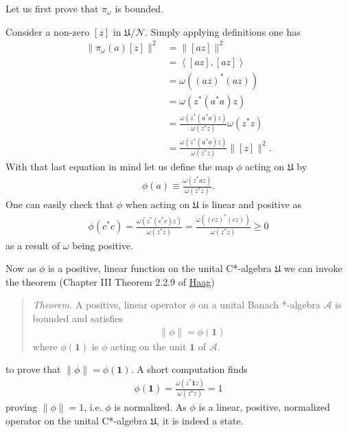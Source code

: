 Let us first prove that $\pi_\omega$ is bounded.

Consider a non-zero $[z]$ in $\mathfrak{U} / \mathcal{N}$. Simply applying definitions one has
\begin{align}
    \|\pi_\omega(a)[z]\|^2 &= \|[az]\|^2 \\
                           &= \left<[az], [az]\right> \\
                           &= \omega((az)^*(az)) \\
                           &= \omega(z^*(a^*a)z) \\
                           &= \frac{\omega(z^*(a^*a)z)}{\omega(z^*z)} \omega(z^*z) \\
                           &= \frac{\omega(z^*(a^*a)z)}{\omega(z^*z)} \|[z]\|^2.
\end{align}
With that last equation in mind let us define the map $\phi$ acting on $\mathfrak{U}$ by
\begin{align}
    \phi(a) \equiv \frac{\omega(z^*az)}{\omega(z^*z)}.
\end{align}
One can easily check that $\phi$ when acting on $\mathfrak{U}$ is linear and positive as
\begin{align}
    \phi(c^*c) = \frac{\omega(z^*(c^*c)z)}{\omega(z^*z)} = \frac{\omega((cz)^*(cz))}{\omega(z^*z)} \ge 0
\end{align}
as a result of $\omega$ being positive.

Now as $\phi$ is a positive, linear function on the unital C*-algebra $\mathfrak{U}$ we can invoke the theorem (Chapter III Theorem 2.2.9 of \href{https://doi.org/10.1007/978-3-642-61458-3}{Haag})

\begin{quote}
    \textit{Theorem.} A positive, linear operator $\phi$ on a unital Banach *-algebra $\mathcal{A}$ is bounded and satisfies
    \begin{align}
        \|\phi\| = \phi(\mathbf{1})
    \end{align}
    where $\phi(\mathbf{1})$ is $\phi$ acting on the unit $\mathbf{1}$ of $\mathcal{A}$.
\end{quote}

\noindent to prove that $\|\phi\| = \phi(\mathbf{1})$. A short computation finds
\begin{align}
    \phi(\mathbf{1}) = \frac{\omega(z^*\mathbf{1}z)}{\omega(z^*z)} = 1
\end{align}
proving $\|\phi\|=1$, i.e. $\phi$ is normalized. As $\phi$ is a linear, positive, normalized operator on the unital C*-algebra $\mathfrak{U}$, it is indeed a state.

